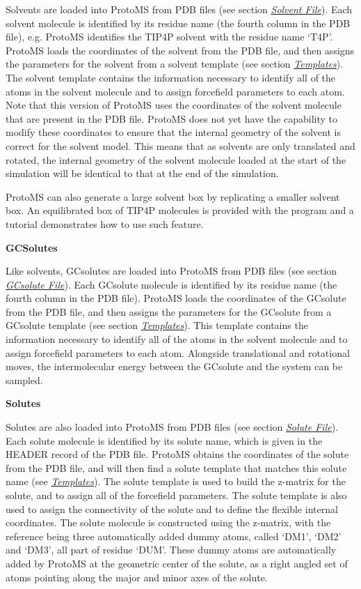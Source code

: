 \documentclass[letterpaper,10pt,english]{sphinxmanual}
\begin{document}
Solvents are loaded into ProtoMS from PDB files (see section {\hyperref[protoms:solventpdb]{\emph{Solvent File}}}). Each solvent molecule is identified by its residue name (the fourth column in the PDB file), e.g. ProtoMS identifies the TIP4P solvent with the residue name ‘T4P’. ProtoMS loads the coordinates of the solvent from the PDB file, and then assigns the parameters for the solvent from a solvent template (see section {\hyperref[protoms:temref]{\emph{Templates}}}). The solvent template contains the information necessary to identify all of the atoms in the solvent molecule and to assign forcefield parameters to each atom. Note that this version of ProtoMS uses the coordinates of the solvent molecule that are present in the PDB file. ProtoMS does not yet have the capability to modify these coordinates to ensure that the internal geometry of the solvent is correct for the solvent model. This means that as solvents are only translated and rotated, the internal geometry of
the solvent molecule loaded at the start of the simulation will be identical to that at the end of the simulation.

ProtoMS can also generate a large solvent box by replicating a smaller solvent box. An equilibrated box of TIP4P molecules is provided with the program and a tutorial demonstrates how to use such feature.

\textbf{GCSolutes}

Like solvents, GCsolutes are loaded into ProtoMS from PDB files (see section {\hyperref[protoms:gcpdb]{\emph{GCsolute File}}}). Each GCsolute molecule is identified by its residue name (the fourth column in the PDB file). ProtoMS loads the coordinates of the GCsolute from the PDB file, and then assigns the parameters for the GCsolute from a GCsolute template (see section {\hyperref[protoms:temref]{\emph{Templates}}}). This template contains the information necessary to identify all of the atoms in the solvent molecule and to assign forcefield parameters to each atom. Alongside translational and rotational moves, the intermolecular energy between the GCsolute and the system can be sampled.

\textbf{Solutes}

Solutes are also loaded into ProtoMS from PDB files (see section {\hyperref[protoms:solpdb]{\emph{Solute File}}}). Each solute molecule is identified by its solute name, which is given in the HEADER record of the PDB file. ProtoMS obtains the coordinates of the solute from the PDB file, and will then find a solute template that matches this solute name (see {\hyperref[protoms:temref]{\emph{Templates}}}). The solute template is used to build the z-matrix for the solute, and to assign all of the forcefield parameters. The solute template is also used to assign the connectivity of the solute and to define the flexible internal coordinates. The solute molecule is constructed using the z-matrix, with the reference being three automatically added dummy atoms, called ‘DM1’, ‘DM2’ and ‘DM3’, all part of residue ‘DUM’. These dummy atoms are automatically added by ProtoMS at the geometric center of the solute, as a right angled set of atoms pointing along the major and minor axes of the solute.
\end{document}
